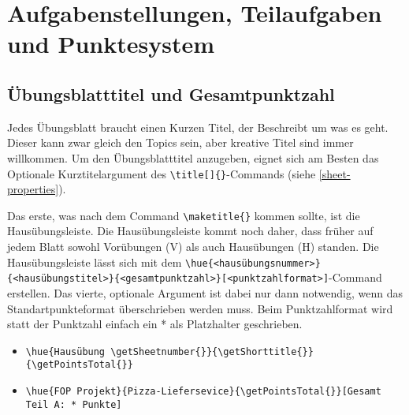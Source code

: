 \documentclass[
    titleprefix=AlgoTeX,
    inlineshortcut=java,
    corporatedesign,
    boxarc,
]{algoexercise}
\begin{document}
    \section{Aufgabenstellungen, Teilaufgaben und Punktesystem}\label{Exercises}
    \vspace{-1em}
    \subsection{Übungsblatttitel und Gesamtpunktzahl}\label{totalpoints_and_sheet_title}
    \vspace{-1em}
    Jedes Übungsblatt braucht einen Kurzen Titel, der Beschreibt um was es geht.
    Dieser kann zwar gleich den Topics sein, aber kreative Titel sind immer willkommen.
    Um den Übungsblatttitel anzugeben, eignet sich am Besten das Optionale Kurztitelargument des \verb+\title[]{}+-Commands (siehe
    \ref{sheet-properties}).

    Das erste, was nach dem Command \verb+\maketitle{}+ kommen sollte, ist die Hausübungsleiste.
    Die Hausübungsleiste kommt noch daher, dass früher auf jedem Blatt sowohl Vorübungen (V) als auch Hausübungen (H) standen.
    Die Hausübungsleiste lässt sich mit dem
    \verb+\hue{<hausübungsnummer>}{<hausübungstitel>}{<gesamtpunktzahl>}[<punktzahlformat>]+-Command erstellen.
    Das vierte, optionale Argument ist dabei nur dann notwendig, wenn das Standartpunkteformat überschrieben werden muss.
    Beim Punktzahlformat wird statt der Punktzahl einfach ein * als Platzhalter geschrieben.

    \begin{beispiele}
        \begin{itemize}
            \item \verb+\hue{Hausübung \getSheetnumber{}}{\getShorttitle{}}{\getPointsTotal{}}+
            \item \verb+\hue{FOP Projekt}{Pizza-Liefersevice}{\getPointsTotal{}}[Gesamt Teil A: * Punkte]+
        \end{itemize}
    \end{beispiele}
    \vspace{-1em}
\end{document}
